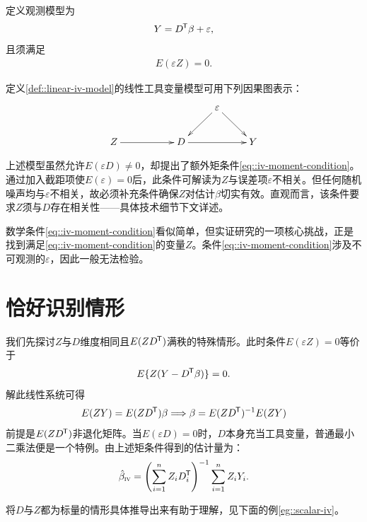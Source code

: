 \begin{definition}
[线性工具变量模型]\label{def::linear-iv-model}
定义观测模型为
$$
Y = D  ^{\mkern-1.5mu\mathsf{T}} \beta  + \varepsilon ,
$$
且须满足
\begin{eqnarray}\label{eq::iv-moment-condition}
E(\varepsilon Z) = 0 . 
\end{eqnarray}
\end{definition}


定义\ref{def::linear-iv-model}的线性工具变量模型可用下列因果图表示： 
$$
\xymatrix{
&&&\varepsilon  \ar[dl] \ar[dr] &\\
Z\ar[rr]&&D \ar[rr]&&Y
}
$$

上述模型虽然允许$E(\varepsilon D) \neq 0$，却提出了额外矩条件\eqref{eq::iv-moment-condition}。通过加入截距项使$E(\varepsilon) = 0$后，此条件可解读为$Z$与误差项$\varepsilon$不相关。但任何随机噪声均与$\varepsilon$不相关，故必须补充条件确保$Z$对估计$\beta$切实有效。直观而言，该条件要求$Z$须与$D$存在相关性——具体技术细节下文详述。  
 

数学条件\eqref{eq::iv-moment-condition}看似简单，但实证研究的一项核心挑战，正是找到满足\eqref{eq::iv-moment-condition}的变量$Z$。条件\eqref{eq::iv-moment-condition}涉及不可观测的$\varepsilon$，因此一般无法检验。 
 


\section{恰好识别情形}
\label{sec::iv-just-identify}

我们先探讨$Z$与$D$维度相同且$E(ZD^{\mkern-1.5mu\mathsf{T}})$满秩的特殊情形。此时条件$E(\varepsilon Z) = 0$等价于
$$
E\{  Z (Y -  D ^{\mkern-1.5mu\mathsf{T}} \beta) \} = 0 .
$$
解此线性系统可得
$$
E(  ZY)  = E(ZD^{\mkern-1.5mu\mathsf{T}}) \beta  \\
 \Longrightarrow 
\beta = E(ZD^{\mkern-1.5mu\mathsf{T}}) ^{-1} E(  ZY)  
$$
前提是$E(ZD^{\mkern-1.5mu\mathsf{T}})$非退化矩阵。当$E(\varepsilon D) = 0$时，$D$本身充当工具变量，普通最小二乘法便是一个特例。由上述矩条件得到的估计量为：
\begin{eqnarray}\label{eq::iv-estimator}
\hat{\beta}_\textsc{iv} = \left(  \sum_{i=1}^n Z_i D_i^{\mkern-1.5mu\mathsf{T}} \right)^{-1}  \sum_{i=1}^n Z_iY_i.
\end{eqnarray}

将$D$与$Z$都为标量的情形具体推导出来有助于理解，见下面的例\ref{eg::scalar-iv}。

